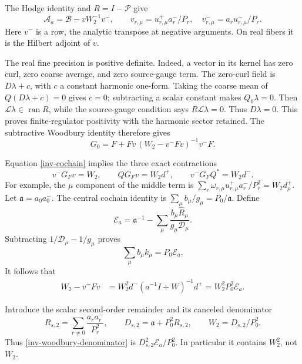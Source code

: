 \documentclass[11pt]{article}
\theoremstyle{remark}
\begin{document}
The Hodge identity and $R=I-\mathcal P$ give
\begin{equation}\label{inv-rank-subtraction}
 \mathcal A_a=\mathcal B-vW_2^{-1}v^-,\qquad
 v_{r,\mu}=u_{r,\mu}^+a_r^-/P_r,
 \quad v_{r,\mu}^-=a_ru_{r,\mu}^-/P_r.
\end{equation}
Here $v^-$ is a row, the analytic transpose at negative arguments.
On real fibers it is the Hilbert adjoint of $v$.

The real fine precision is positive definite. Indeed, a vector in its
kernel has zero curl, zero coarse average, and zero source-gauge term.
The zero-curl field is $D\lambda+c$, with $c$ a constant harmonic
one-form. Taking the coarse mean of $Q(D\lambda+c)=0$ gives $c=0$;
subtracting a scalar constant makes $Q_0\lambda=0$. Then
$\mathcal L\lambda\in\operatorname{ran}R$, while the source-gauge
condition says $R\mathcal L\lambda=0$. Thus $D\lambda=0$.
This proves finite-regulator positivity with the harmonic sector
retained. The subtractive Woodbury identity therefore gives
\begin{equation}\label{inv-G-woodbury}
 G_0=F+Fv\,(W_2-v^-Fv)^{-1}v^-F.
\end{equation}

Equation \eqref{inv-cochain} implies the three exact contractions
\begin{equation}\label{inv-three-contractions}
 v^-G_Fv=W_2,\qquad QG_Fv=W_2d^+,
 \qquad v^-G_FQ^*=W_2d^-.
\end{equation}
For example, the $\mu$ component of the middle term is
$\sum_r\omega_{r,\mu}u_{r,\mu}^+a_r^-/P_r^2=W_2d_\mu^+$.
Let $\mathfrak a=a_0a_0^-$. The central cochain identity is
$\sum_\mu b_\mu/g_\mu=P_0/\mathfrak a$. Define
\begin{equation}\label{inv-Ea}
 \mathcal E_a=\mathfrak a^{-1}
 -\sum_\mu\frac{b_\mu\widehat R_\mu}{g_\mu\mathcal D_\mu}.
\end{equation}
Subtracting $1/\mathcal D_\mu-1/g_\mu$ proves
\begin{equation}\label{inv-Ea-identity}
 \sum_\mu b_\mu k_\mu=P_0\mathcal E_a.
\end{equation}
It follows that
\begin{align}
 W_2-v^-Fv
 &=W_2^2d^-(a^{-1}I+W)^{-1}d^+
  =W_2^2P_0^2\mathcal E_a.
 \label{inv-woodbury-denominator}
\end{align}

Introduce the scalar second-order remainder and its canceled denominator
\begin{equation}\label{inv-Ds2}
 R_{s,2}=\sum_{r\ne0}\frac{a_ra_r^-}{P_r^2},\qquad
 D_{s,2}=\mathfrak a+P_0^2R_{s,2},\qquad
 W_2=D_{s,2}/P_0^2.
\end{equation}
Thus \eqref{inv-woodbury-denominator} is
$D_{s,2}^2\mathcal E_a/P_0^2$. In particular it contains $W_2^2$,
not $W_2$.
\end{document}
